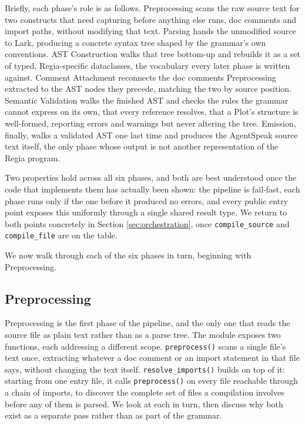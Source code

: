 Briefly, each phase's role is as follows. Preprocessing scans the raw source text for two constructs that need capturing before anything else runs, doc comments and import paths, without modifying that text. Parsing hands the unmodified source to Lark, producing a concrete syntax tree shaped by the grammar's own conventions. AST Construction walks that tree bottom-up and rebuilds it as a set of typed, Regia-specific dataclasses, the vocabulary every later phase is written against. Comment Attachment reconnects the doc comments Preprocessing extracted to the AST nodes they precede, matching the two by source position. Semantic Validation walks the finished AST and checks the rules the grammar cannot express on its own, that every reference resolves, that a Plot's structure is well-formed, reporting errors and warnings but never altering the tree. Emission, finally, walks a validated AST one last time and produces the AgentSpeak source text itself, the only phase whose output is not another representation of the Regia program.

Two properties hold across all six phases, and both are best understood once the code that implements them has actually been shown: the pipeline is fail-fast, each phase runs only if the one before it produced no errors, and every public entry point exposes this uniformly through a single shared result type. We return to both points concretely in Section \ref{sec:orchestration}, once \lstinline|compile_source| and \lstinline|compile_file| are on the table.

We now walk through each of the six phases in turn, beginning with Preprocessing.

\subsection{Preprocessing}
\label{sec:preprocessing}
Preprocessing is the first phase of the pipeline, and the only one that reads the source file as plain text rather than as a parse tree. The module exposes two functions, each addressing a different scope. \lstinline|preprocess()| scans a single file's text once, extracting whatever a doc comment or an import statement in that file says, without changing the text itself. \lstinline|resolve_imports()| builds on top of it: starting from one entry file, it calls \lstinline|preprocess()| on every file reachable through a chain of imports, to discover the complete set of files a compilation involves before any of them is parsed. We look at each in turn, then discuss why both exist as a separate pass rather than as part of the grammar.

